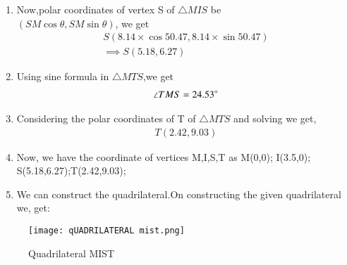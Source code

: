 \documentclass[journal,12pt,twocolumn]{IEEEtran}
\begin{document}
\begin{enumerate}
\item Now,polar coordinates of vertex S of $\triangle MIS$ be
\\$(SM \cos \theta,SM\sin \theta)$, we get
\begin{align}
S(8.14\times \cos50.47 ,8.14\times \sin50.47)
\\
\implies S(5.18,6.27)
\end{align}
\item Using sine formula in $\triangle MTS$,we get
\begin{align}
\angle TMS= 24.53\degree
\end{align}
\item Considering the polar coordinates of T of $\triangle MTS$ and solving we get,
\begin{align}
T(2.42,9.03)
\end{align}
    \item Now, we have the coordinate of vertices M,I,S,T as M(0,0); I(3.5,0); S(5.18,6.27);T(2.42,9.03);
    \item We can construct the quadrilateral.On constructing the given quadrilateral we, get:
\end{enumerate}
\begin{figure}[!ht]
\centering
\texttt{[image: qUADRILATERAL mist.png]}
\caption{Quadrilateral MIST}
\label{fig:Quadrilateral MIST}	
\end{figure}
\end{document}
